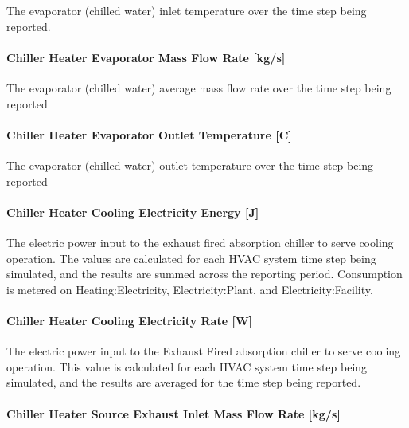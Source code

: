 The evaporator (chilled water) inlet temperature over the time step being reported.

\paragraph{Chiller Heater Evaporator Mass Flow Rate {[}kg/s{]}}\label{chiller-heater-evaporator-mass-flow-rate-kgs}

The evaporator (chilled water) average mass flow rate over the time step being reported

\paragraph{Chiller Heater Evaporator Outlet Temperature {[}C{]}}\label{chiller-heater-evaporator-outlet-temperature-c}

The evaporator (chilled water) outlet temperature over the time step being reported

\paragraph{Chiller Heater Cooling Electricity Energy {[}J{]}}\label{chiller-heater-cooling-electric-energy-j-1}

The electric power input to the exhaust fired absorption chiller to serve cooling operation. The values are calculated for each HVAC system time step being simulated, and the results are summed across the reporting period. Consumption is metered on Heating:Electricity, Electricity:Plant, and Electricity:Facility.

\paragraph{Chiller Heater Cooling Electricity Rate {[}W{]}}\label{chiller-heater-cooling-electric-power-w-1}

The electric power input to the Exhaust Fired absorption chiller to serve cooling operation. This value is calculated for each HVAC system time step being simulated, and the results are averaged for the time step being reported.

\paragraph{Chiller Heater Source Exhaust Inlet Mass Flow Rate {[}kg/s{]}}\label{chiller-heater-source-exhaust-inlet-mass-flow-rate-kgs}

